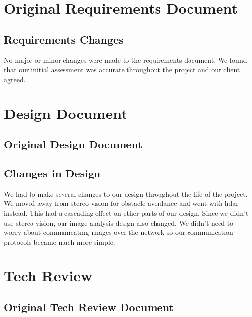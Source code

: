 \documentclass[compsoc,draftclsnofoot,onecolumn,10pt]{IEEEtran}
\begin{document}
\section{Original Requirements Document}



    \subsection{Requirements Changes}
    No major or minor changes were made to the requirements document. We found that our initial assessment was accurate throughout the project and our client agreed.



\section{Design Document}
    \subsection{Original Design Document}


    \subsection{Changes in Design}
    We had to make several changes to our design throughout the life of the project. We moved away from stereo vision for obstacle avoidance and went with lidar instead. This had a cascading effect on other parts of our design. Since we didn't use stereo vision, our image analysis design also changed. We didn't need to worry about communicating images over the network so our communication protocols became much more simple.


\section{Tech Review}
    \subsection{Original Tech Review Document}

\end{document}
